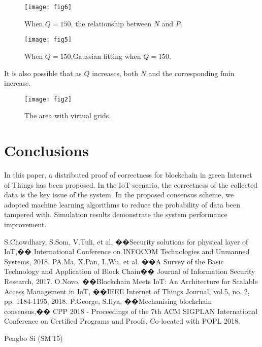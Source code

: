\documentclass{ieeeaccess}
\begin{document}
\begin{figure}[htbp]
\begin{center}
\texttt{[image: fig6]}
\caption{When $Q=150$, the relationship between $N$ and $P$.}
\label{f}
\end{center}
\end{figure}

\begin{figure}[htbp]
\begin{center}
\texttt{[image: fig5]}
\caption{When $Q=150$,Gaussian fitting when $Q=150$.}
\label{f}
\end{center}
\end{figure}
It is also possible that as $Q$ increases, both $N$ and the corresponding fmin increase. 
\begin{figure}[htbp]
\begin{center}
\texttt{[image: fig2]}
\caption{The area with virtual grids.}
\label{f}
\end{center}
\end{figure}

\section{Conclusions}

In this paper, a distributed proof of correctness for blockchain in green Internet of Things has been proposed. In the IoT scenario, the correctness of the collected data is the key issue of the system. In the proposed consensus scheme, we adopted machine learning algorithms to reduce the probability of data been tampered with. Simulation results demonstrate the system performance improvement.

\begin{thebibliography}{00}

 S.Chowdhary, S.Som, V.Tuli, et al,  ��Security solutions for physical layer of IoT,�� International Conference on INFOCOM Technologies and Unmanned Systems, 2018.
 PA.Ma, X.Pan, L.Wu, et al. ��A Survey of the Basic Technology and Application of Block Chain�� Journal of Information Security Research, 2017.
 O.Novo, ��Blockchain Meets IoT: An Architecture for Scalable Access Management in IoT, ��IEEE Internet of Things Journal, vol.5, no. 2, pp. 1184-1195, 2018.
 P.George, S.Ilya, ��Mechanising blockchain consensus,�� CPP 2018 - Proceedings of the 7th ACM SIGPLAN International Conference on Certified Programs and Proofs, Co-located with POPL 2018.

\end{thebibliography}

\begin{IEEEbiography}{Pengbo Si} (SM'15)
\end{IEEEbiography}

\EOD
\end{document}
